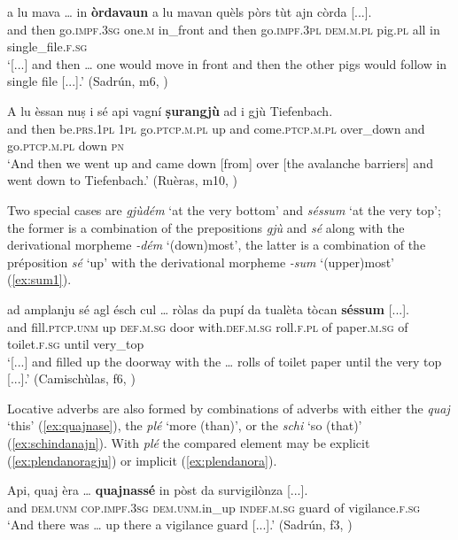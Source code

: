 \ea
\label{ex:advcomb2}
\gll    [...] a lu mava … in \textbf{òrdavaun} a lu mavan quèls pòrs tùt ajn còrda [...].\\
{} and then go.\textsc{impf.3sg} {} one.\textsc{m} in\_front and then go.\textsc{impf.3pl} \textsc{dem.m.pl} pig.\textsc{pl} all in single\_file.\textsc{f.sg} \\
\glt `[...] and then … one would move in front and then the other pigs would follow in single file [...].' (Sadrún, m6, )
\z

\ea
\label{ex:advcomb3}
\gll A lu èssan nuṣ i sé api vagní \textbf{ṣurangjù} ad i gjù Tiefenbach.\\
and then be.\textsc{prs.1pl} \textsc{1pl} go.\textsc{ptcp.m.pl} up and come.\textsc{ptcp.m.pl} over\_down and go.\textsc{ptcp.m.pl} down \textsc{pn}\\
\glt `And then we went up and came down [from] over [the avalanche barriers] and went down to Tiefenbach.' (Ruèras, m10, )
\z

Two special cases are \textit{gjùdém} `at the very bottom' and \textit{séssum} `at the very top'; the former is a combination of the prepositions \textit{gjù} and \textit{sé} along with the derivational morpheme \textit{-dém} `(down)most', the latter is a combination of the préposition \textit{sé} `up' with the derivational morpheme \textit{-sum} `(upper)most' (\ref{ex:sum1}).

\ea
\label{ex:sum1}
\gll [...] ad amplanju sé agl ésch cul … ròlas da pupí da tualèta tòcan \textbf{séssum} [...].\\
{} and fill.\textsc{ptcp.unm} up \textsc{def.m.sg} door with.\textsc{def.m.sg} {} roll.\textsc{f.pl} of paper.\textsc{m.sg} of toilet.\textsc{f.sg} until very\_top\\
\glt `[...] and filled up the doorway with the … rolls of toilet paper until the very top [...].' (Camischùlas, f6, )
\z

Locative adverbs are also formed by combinations of adverbs with either the  \textit{quaj} `this' (\ref{ex:quajnase}), the  \textit{plé} `more (than)', or the  \textit{schi} `so (that)' (\ref{ex:schindanajn}). With \textit{plé} the compared element may be explicit (\ref{ex:plendanoragju}) or implicit (\ref{ex:plendanora}).

\ea
\label{ex:quajnase}
\gll  Api, quaj èra … \textbf{quajnassé} in pòst da survigilònza [...].\\
and \textsc{dem.unm} \textsc{cop.impf.3sg} {} \textsc{dem.unm}.in\_up \textsc{indef.m.sg} guard of vigilance.\textsc{f.sg}\\
\glt `And there was … up there a vigilance guard [...].' (Sadrún, f3, )
\z

